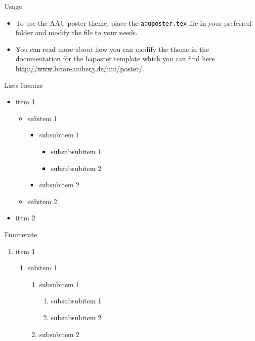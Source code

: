 \documentclass{article}
\begin{document}
\begin{poster}
\begin{posterbox}[name=usage,column=0,below=intro]{Usage}
\begin{itemize}
  \item To use the AAU poster theme, place the {\tt aauposter.tex} file in your preferred folder and modify the file to your needs.
  \item You can read more about how you can modify the theme in the documentation for the baposter template which you can find here \url{http://www.brian-amberg.de/uni/poster/}.
\end{itemize}
\end{posterbox}

\begin{posterbox}[name=lists,column=0,below=usage]{Lists}
Itemize
\begin{itemize}
  \item item 1
    \begin{itemize}
      \item subitem 1
        \begin{itemize}
          \item subsubitem 1
            \begin{itemize}
              \item subsubsubitem 1
              \item subsubsubitem 2
            \end{itemize}
          \item subsubitem 2
        \end{itemize}
      \item subitem 2
    \end{itemize}
  \item item 2
\end{itemize}
Enumerate
\begin{enumerate}
  \item item 1
    \begin{enumerate}
      \item subitem 1
        \begin{enumerate}
          \item subsubitem 1
            \begin{enumerate}
              \item subsubsubitem 1
              \item subsubsubitem 2
            \end{enumerate}
          \item subsubitem 2
        \end{enumerate}

\end{enumerate}
\end{enumerate}
\end{posterbox}
\end{poster}
\end{document}
